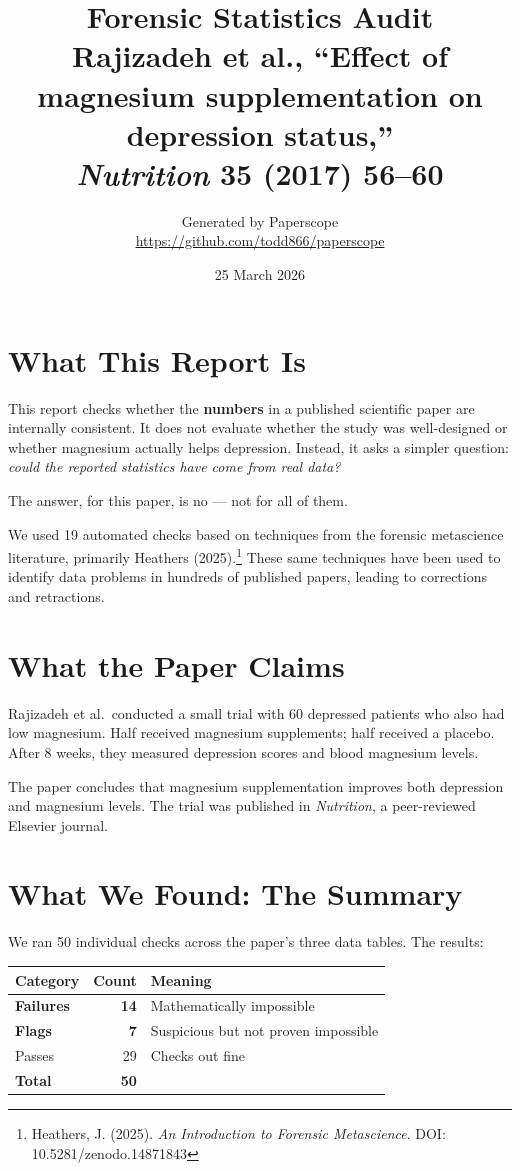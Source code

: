 \documentclass[11pt]{article}
\title{Forensic Statistics Audit\\[0.3em]
\large Rajizadeh et al., ``Effect of magnesium supplementation on depression status,''\\
\textit{Nutrition} 35 (2017) 56--60}
\author{Generated by Paperscope\\
\small \url{https://github.com/todd866/paperscope}}
\date{25 March 2026}
\begin{document}
\maketitle

\section*{What This Report Is}

This report checks whether the \textbf{numbers} in a published scientific paper are internally consistent. It does not evaluate whether the study was well-designed or whether magnesium actually helps depression. Instead, it asks a simpler question: \textit{could the reported statistics have come from real data?}

The answer, for this paper, is no --- not for all of them.

We used 19 automated checks based on techniques from the forensic metascience literature, primarily Heathers (2025).\footnote{Heathers, J. (2025). \textit{An Introduction to Forensic Metascience}. DOI: 10.5281/zenodo.14871843} These same techniques have been used to identify data problems in hundreds of published papers, leading to corrections and retractions.

\section*{What the Paper Claims}

Rajizadeh et al.\ conducted a small trial with 60 depressed patients who also had low magnesium. Half received magnesium supplements; half received a placebo. After 8 weeks, they measured depression scores and blood magnesium levels.

The paper concludes that magnesium supplementation improves both depression and magnesium levels. The trial was published in \textit{Nutrition}, a peer-reviewed Elsevier journal.

\section*{What We Found: The Summary}

We ran 50 individual checks across the paper's three data tables. The results:

\begin{center}
\begin{tabular}{lrl}
\toprule
\textbf{Category} & \textbf{Count} & \textbf{Meaning} \\
\midrule
\textcolor{fail}{\textbf{Failures}} & \textcolor{fail}{\textbf{14}} & Mathematically impossible \\
\textcolor{flag}{\textbf{Flags}} & \textcolor{flag}{\textbf{7}} & Suspicious but not proven impossible \\
\textcolor{pass}{Passes} & \textcolor{pass}{29} & Checks out fine \\
\midrule
\textbf{Total} & \textbf{50} & \\
\bottomrule
\end{tabular}
\end{center}
\end{document}
